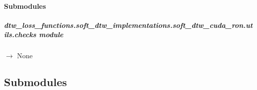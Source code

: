 \documentclass[letterpaper,10pt,english]{sphinxmanual}
\begin{document}
\paragraph{Submodules}
\label{\detokenize{dtw_loss_functions.soft_dtw_implementations.soft_dtw_cuda_ron.utils:submodules}}
\sphinxstepscope


\subparagraph{dtw\_loss\_functions.soft\_dtw\_implementations.soft\_dtw\_cuda\_ron.utils.checks module}
\label{\detokenize{dtw_loss_functions.soft_dtw_implementations.soft_dtw_cuda_ron.utils.checks:module-dtw_loss_functions.soft_dtw_implementations.soft_dtw_cuda_ron.utils.checks}}\label{\detokenize{dtw_loss_functions.soft_dtw_implementations.soft_dtw_cuda_ron.utils.checks:dtw-loss-functions-soft-dtw-implementations-soft-dtw-cuda-ron-utils-checks-module}}\label{\detokenize{dtw_loss_functions.soft_dtw_implementations.soft_dtw_cuda_ron.utils.checks::doc}}

\begin{fulllineitems}
\label{\detokenize{dtw_loss_functions.soft_dtw_implementations.soft_dtw_cuda_ron.utils.checks:dtw_loss_functions.soft_dtw_implementations.soft_dtw_cuda_ron.utils.checks.check_D}}
\pysigstartsignatures
\pysiglinewithargsret
{}
{}
{{ $\rightarrow$ None}}
\pysigstopsignatures
\end{fulllineitems}



\subsection{Submodules}
\label{\detokenize{dtw_loss_functions.soft_dtw_implementations.soft_dtw_cuda_ron:submodules}}
\sphinxstepscope
\end{document}
